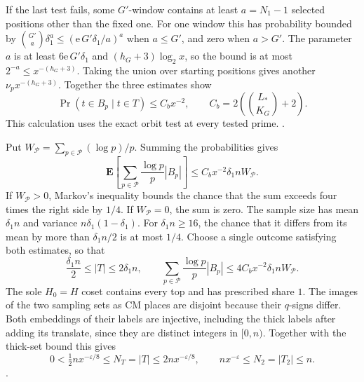If the last test fails, some \(G'\)-window contains at least
\(a=N_1-1\) selected positions other than the fixed one.
For one window this has probability bounded by
\(\binom{G'}{a}\delta_1^a\le(\mathrm e\,G'\delta_1/a)^a\)
when \(a\le G'\), and zero when \(a>G'\). The parameter \(a\)
is at least \(6\mathrm e\,G'\delta_1\) and \((h_G+3)\log_2 x\),
so the bound is at most \(2^{-a}\le x^{-(h_G+3)}\).
Taking the union over starting positions gives another
\(\nu_p x^{-(h_G+3)}\). Together the three estimates show
\[
 \Pr(t\in B_p\mid t\in T)\le C_bx^{-2},\qquad
 C_b=2\left(\binom{L_*}{K_G}+2\right).
\]
This calculation uses the exact orbit test at every tested prime.
.

Put \(W_{\mathcal P}=\sum_{p\in\mathcal P}(\log p)/p\).
Summing the probabilities gives
\[
 \mathbf E\left[\sum_{p\in\mathcal P}\frac{\log p}{p}|B_p|\right]
 \le C_bx^{-2}\delta_1 n W_{\mathcal P}.
\]
If \(W_{\mathcal P}>0\), Markov's inequality bounds the chance
that the sum exceeds four times the right side by \(1/4\).
If \(W_{\mathcal P}=0\), the sum is zero. The sample size has
mean \(\delta_1 n\) and variance \(n\delta_1(1-\delta_1)\).
For \(\delta_1 n\ge16\), the chance that it differs from its
mean by more than \(\delta_1 n/2\) is at most \(1/4\).
Choose a single outcome satisfying both estimates, so that
\[
 \frac{\delta_1 n}{2}\le |T|\le 2\delta_1 n,\qquad
 \sum_{p\in\mathcal P}\frac{\log p}{p}|B_p|
     \le 4C_bx^{-2}\delta_1 nW_{\mathcal P}.
\]
The sole \(H_0=H\) coset contains every top and has prescribed
share \(1\). The images of the two sampling sets as CM places
are disjoint because their \(q\)-signs differ. Both embeddings
of their labels are injective, including the thick labels after
adding its translate, since they are distinct integers in
\([0,n)\). Together with the thick-set bound this gives
\begin{equation}
\label{eq:classical-sampling-size}
 0<\tfrac12 n x^{-\varepsilon/8}\le N_T=|T|\le2n x^{-\varepsilon/8},
 \qquad n x^{-\varepsilon}\le N_2=|T_2|\le n .
\end{equation}
.

